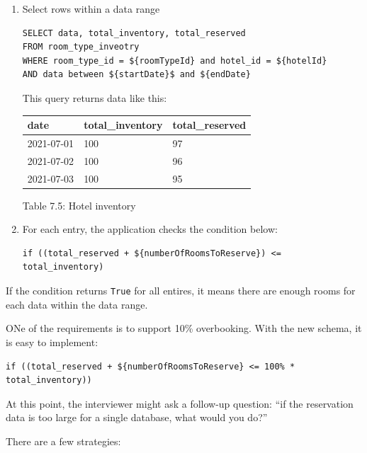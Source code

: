 \documentclass{report}
\theoremstyle{definition}
\begin{document}
\begin{enumerate}
\item
Select rows within a data range

\begin{lstlisting}
SELECT data, total_inventory, total_reserved
FROM room_type_inveotry
WHERE room_type_id = ${roomTypeId} and hotel_id = ${hotelId}
AND data between ${startDate}$ and ${endDate}
\end{lstlisting}

This query returns data like this:

\begin{tabular}{|p{3cm}|p{3cm}|p{2cm}|}
\hline
date & total\_inventory & total\_reserved \\
\hline
2021-07-01 & 100 & 97 \\
\hline
2021-07-02 & 100 & 96 \\
\hline
2021-07-03 & 100 & 95 \\
\hline
\end{tabular}

Table 7.5: Hotel inventory
\item
For each entry, the application checks the condition below:

\begin{lstlisting}
if ((total_reserved + ${numberOfRoomsToReserve}) <= total_inventory)
\end{lstlisting}
\end{enumerate}

If the condition returns \lstinline|True| for all entires, it means there are enough rooms for each data within the data range.

ONe of the requirements is to support 10\% overbooking. With the new schema, it is easy to implement:

\begin{lstlisting}
if ((total_reserved + ${numberOfRoomsToReserve} <= 100% * total_inventory))
\end{lstlisting}

At this point, the interviewer might ask a follow-up question: ``if the reservation data is too large for a single database, what would you do?''

There are a few strategies:
\end{document}
